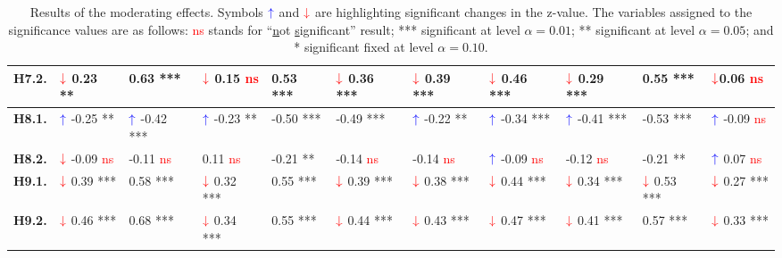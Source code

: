 \begin{table}[htpb]
{\begin{tabular}{|l|ll|ll|ll|ll|ll|}
\textbf{H7.2.} &
  \multicolumn{1}{l|}{$\textcolor{red}{\downarrow}$ 0.23 **} &
  0.63 *** &
  \multicolumn{1}{l|}{$\textcolor{red}{\downarrow}$ 0.15 \textcolor{red}{ns}} &
  0.53 *** &
  \multicolumn{1}{l|}{$\textcolor{red}{\downarrow}$ 0.36 ***} &
  $\textcolor{red}{\downarrow}$ 0.39 *** &
  \multicolumn{1}{l|}{$\textcolor{red}{\downarrow}$ 0.46 ***} &
  $\textcolor{red}{\downarrow}$ 0.29 *** &
  \multicolumn{1}{l|}{0.55 ***} &
  $\textcolor{red}{\downarrow}$0.06 \textcolor{red}{ns} \\ \hline
\textbf{H8.1.} &
  \multicolumn{1}{l|}{$\textcolor{blue}{\uparrow}$ -0.25 **} &
  $\textcolor{blue}{\uparrow}$ -0.42 *** &
  \multicolumn{1}{l|}{$\textcolor{blue}{\uparrow}$ -0.23 **} &
  -0.50 *** &
  \multicolumn{1}{l|}{-0.49 ***} &
  $\textcolor{blue}{\uparrow}$ -0.22 ** &
  \multicolumn{1}{l|}{$\textcolor{blue}{\uparrow}$ -0.34 ***} &
  $\textcolor{blue}{\uparrow}$ -0.41 *** &
  \multicolumn{1}{l|}{-0.53 ***} &
  $\textcolor{blue}{\uparrow}$ -0.09 \textcolor{red}{ns} \\ \hline
\textbf{H8.2.} &
  \multicolumn{1}{l|}{$\textcolor{red}{\downarrow}$ -0.09 \textcolor{red}{ns}} &
  -0.11 \textcolor{red}{ns} &
  \multicolumn{1}{l|}{0.11 \textcolor{red}{ns}} &
  -0.21 ** &
  \multicolumn{1}{l|}{-0.14 \textcolor{red}{ns}} &
  -0.14 \textcolor{red}{ns} &
  \multicolumn{1}{l|}{$\textcolor{blue}{\uparrow}$ -0.09 \textcolor{red}{ns}} &
  -0.12 \textcolor{red}{ns} &
  \multicolumn{1}{l|}{-0.21 **} &
  $\textcolor{blue}{\uparrow}$ 0.07 \textcolor{red}{ns} \\ \hline
\textbf{H9.1.} &
  \multicolumn{1}{l|}{$\textcolor{red}{\downarrow}$ 0.39 ***} &
  0.58 *** &
  \multicolumn{1}{l|}{$\textcolor{red}{\downarrow}$ 0.32 ***} &
  0.55 *** &
  \multicolumn{1}{l|}{$\textcolor{red}{\downarrow}$ 0.39 ***} &
  $\textcolor{red}{\downarrow}$ 0.38 *** &
  \multicolumn{1}{l|}{$\textcolor{red}{\downarrow}$ 0.44 ***} &
  $\textcolor{red}{\downarrow}$ 0.34 *** &
  \multicolumn{1}{l|}{$\textcolor{red}{\downarrow}$ 0.53 ***} &
  $\textcolor{red}{\downarrow}$ 0.27 *** \\ \hline
\textbf{H9.2.} &
  \multicolumn{1}{l|}{$\textcolor{red}{\downarrow}$ 0.46 ***} &
  0.68 *** &
  \multicolumn{1}{l|}{$\textcolor{red}{\downarrow}$ 0.34 ***} &
  0.55 *** &
  \multicolumn{1}{l|}{$\textcolor{red}{\downarrow}$ 0.44 ***} &
  $\textcolor{red}{\downarrow}$ 0.43 *** &
  \multicolumn{1}{l|}{$\textcolor{red}{\downarrow}$ 0.47 ***} &
  $\textcolor{red}{\downarrow}$ 0.41 *** &
  \multicolumn{1}{l|}{0.57 ***} &
  $\textcolor{red}{\downarrow}$ 0.33 *** \\ \hline
\end{tabular}%
}
\caption{Results of the moderating effects. Symbols $\textcolor{blue}{\uparrow}$ and $\textcolor{red}{\downarrow}$ are highlighting significant changes in
the z-value. The variables assigned to the significance values are as follows: \textcolor{red}{ns} stands for ``\underline{n}ot \underline{s}ignificant'' result; *** significant at level $\alpha = 0.01$; ** significant at level $\alpha = 0.05$; and * significant fixed at level $\alpha = 0.10$.}
\label{tab:tab012}
\end{table}
